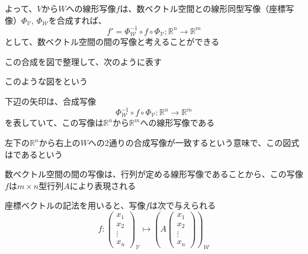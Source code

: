 \documentclass[../../../topic_linear-algebra]{subfiles}
\begin{document}
よって、$V$から$W$への線形写像$f$は、数ベクトル空間との線形同型写像（座標写像）$\Phi_\mathcal{V}, \, \Phi_\mathcal{W}$を合成すれば、
\begin{equation*}
  f' = \Phi_\mathcal{W}^{-1} \circ f \circ \Phi_\mathcal{V} : \mathbb{R}^n \to \mathbb{R}^m
\end{equation*}
として、数ベクトル空間の間の写像と考えることができる

\br

この合成を図で整理して、次のように表す

\begin{center}
\end{center}

このような図をという

\br

下辺の矢印は、合成写像
\begin{equation*}
  \Phi^{-1}_{\mathcal{W}} \circ f \circ \Phi_{\mathcal{V}} : \mathbb{R}^n \to \mathbb{R}^m
\end{equation*}
を表していて、この写像は$\mathbb{R}^n$から$\mathbb{R}^m$への線形写像である

\br

左下の$\mathbb{R}^n$から右上の$W$への2通りの合成写像が一致するという意味で、この図式はであるという

\sectionline

数ベクトル空間の間の写像は、行列が定める線形写像であることから、この写像$f$は$m \times n$型行列$A$により表現される

\begin{center}
\end{center}

\br

座標ベクトルの記法を用いると、写像$f$は次で与えられる
\begin{equation*}
  f\colon \begin{pmatrix}
    x_1    \\
    x_2    \\
    \vdots \\
    x_n
  \end{pmatrix}_{\mathcal{V}}
  \mapsto \left( A \begin{pmatrix}
      x_1    \\
      x_2    \\
      \vdots \\
      x_n
    \end{pmatrix} \right)_\mathcal{W}
\end{equation*}
\end{document}
